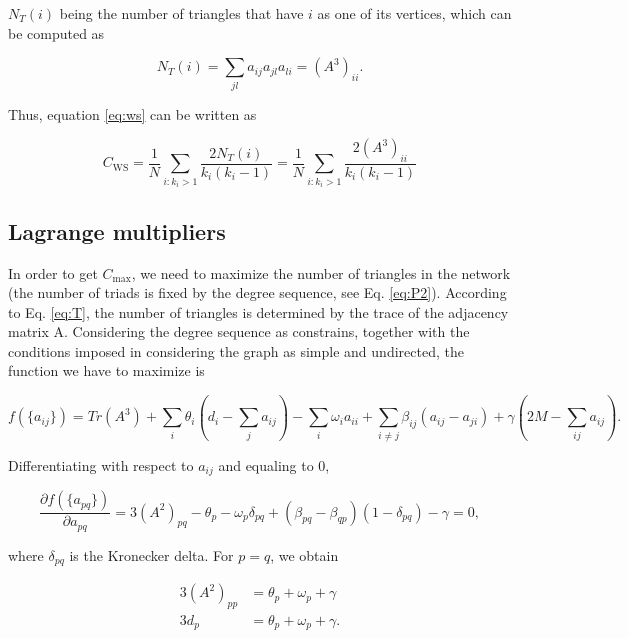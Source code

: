\documentclass{article}
\begin{document}

$N_T(i)$ being the number of triangles that have $i$ as one of its vertices, which can be computed as

\begin{equation}
    N_T(i) = \sum_{jl} a_{ij} a_{jl} a_{li} = (A^3)_{ii}.
\end{equation}

Thus, equation \ref{eq:ws} can be written as

\begin{equation} \label{eq:Cws}
    C_{\mathrm{WS}} = \dfrac{1}{N} \sum\limits_{i:k_i>1}  \dfrac{2 N_{T}(i)}{k_i (k_i-1)} =  \dfrac{1}{N} \sum\limits_{i:k_i>1} \dfrac{2 (A^3)_{ii}}{k_i (k_i-1)} 
\end{equation}


\subsection{Lagrange multipliers}

In order to get $C_{\mathrm{max}}$, we need to maximize the number of triangles in the network (the number of triads is fixed by the degree sequence, see Eq. \ref{eq:P2}). According to Eq. \ref{eq:T}, the number of triangles is determined by the trace of the adjacency matrix A. Considering the degree sequence as constrains, together with the conditions imposed in considering the graph as simple and undirected, the function we have to maximize is

\begin{equation}
    f(\lbrace a_{ij} \rbrace) = Tr(A^3) + \sum_i \theta_i \left(d_i - \sum_j a_{ij} \right) - \sum_i \omega_i a_{ii} + \sum_{i\neq j} \beta_{ij} (a_{ij}-a_{ji}) + \gamma \left(2M - \sum_{ij} a_{ij} \right).
\end{equation}

Differentiating with respect to $a_{ij}$ and equaling to 0,

\begin{equation}
    \dfrac{\partial f(\lbrace a_{pq} \rbrace)}{\partial a_{pq}} = 3 (A^2)_{pq} - \theta_p - \omega_p \delta_{pq} + (\beta_{pq} - \beta_{qp}) (1-\delta_{pq}) - \gamma = 0,
\end{equation}

where $\delta_{pq}$ is the Kronecker delta. For $p=q$, we obtain

\begin{align}
    3 (A^2)_{pp} &= \theta_p + \omega_p + \gamma \\
    3 d_p &=  \theta_p + \omega_p + \gamma.
\end{align}
\end{document}
